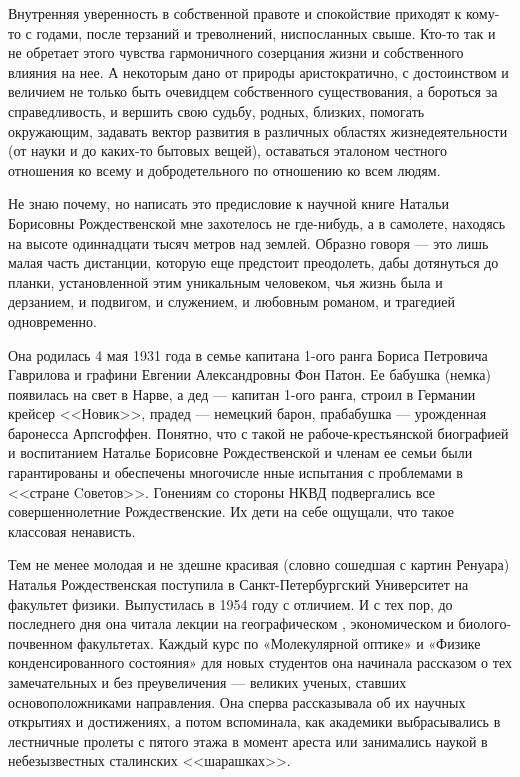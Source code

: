 ﻿\newpage
\vskip 10mm
\vskip 3mm 
\vskip 1cm
\thispagestyle{empty}


Внутренняя уверенность в собственной правоте и спокойствие приходят к кому-то с годами, после терзаний и треволнений, ниспосланных свыше. Кто-то так и не обретает этого чувства гармоничного созерцания жизни и собственного влияния на нее. А некоторым дано от природы аристократично, с достоинством и величием не только быть очевидцем собственного существования, а бороться за справедливость, и вершить свою судьбу, родных, близких, помогать окружающим, задавать вектор развития в различных областях жизнедеятельности (от науки и до каких-то бытовых вещей), оставаться эталоном честного отношения ко всему и добродетельного по отношению ко всем людям.

Не знаю почему, но написать это предисловие к научной книге Натальи Борисовны Рождественской мне захотелось не где-нибудь, а в самолете, находясь на высоте одиннадцати тысяч метров над землей. Образно говоря --- это лишь малая часть дистанции, которую еще предстоит преодолеть, дабы дотянуться до планки, установленной этим уникальным человеком, чья жизнь была и дерзанием, и подвигом, и служением, и любовным романом, и трагедией одновременно.

Она родилась 4 мая 1931 года в семье капитана 1-ого ранга Бориса Петровича Гаврилова и графини Евгении Александровны Фон Патон. Ее бабушка (немка) появилась на свет в Нарве, а дед --- капитан 1-ого ранга, строил в Германии крейсер <<Новик>>, прадед --- немецкий барон, прабабушка --- урожденная баронесса Арпсгоффен. Понятно, что с такой не рабоче-крестьянской биографией и воспитанием Наталье Борисовне Рождественской и членам ее семьи были гарантированы и обеспечены многочисле                                                       нные испытания с проблемами в <<стране Cоветов>>. Гонениям со стороны НКВД подвергались все совершеннолетние Рождественские. Их дети на себе ощущали, что такое классовая ненависть.

Тем не менее молодая и не здешне красивая (словно сошедшая с картин Ренуара) Наталья Рождественская поступила в Санкт-Петербургский Университет на факультет физики. Выпустилась в 1954 году с отличием. И с тех пор, до последнего дня она читала лекции на географическом , экономическом и биолого-почвенном факультетах. Каждый курс по «Молекулярной оптике» и «Физике конденсированного состояния» для новых студентов она начинала рассказом о тех замечательных и без преувеличения --- великих ученых, ставших основоположниками направления. Она сперва рассказывала об их научных открытиях и достижениях, а потом вспоминала, как академики выбрасывались в лестничные пролеты с пятого этажа в момент ареста или занимались наукой в небезызвестных сталинских <<шарашках>>.

